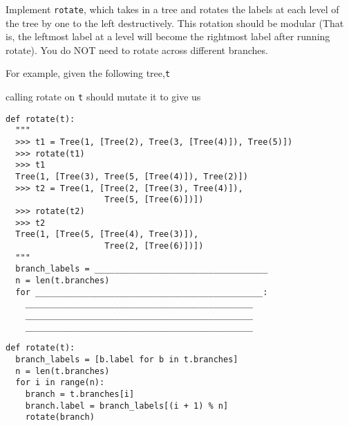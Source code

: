 \begin{blocksection}
\question Implement \texttt{rotate}, which takes in a tree and rotates the labels at each level of the tree by one to the left destructively. This rotation should be modular (That is, the leftmost label at a level will become the rightmost label after running rotate). You do NOT need to rotate across different branches.

For example, given the following tree,\texttt{t}


calling rotate on \texttt{t} should mutate it to give us 


\begin{lstlisting}
def rotate(t):
  """
  >>> t1 = Tree(1, [Tree(2), Tree(3, [Tree(4)]), Tree(5)])
  >>> rotate(t1)
  >>> t1
  Tree(1, [Tree(3), Tree(5, [Tree(4)]), Tree(2)])
  >>> t2 = Tree(1, [Tree(2, [Tree(3), Tree(4)]), 
                    Tree(5, [Tree(6)])])
  >>> rotate(t2)
  >>> t2
  Tree(1, [Tree(5, [Tree(4), Tree(3)]), 
                    Tree(2, [Tree(6)])])
  """
  branch_labels = ___________________________________
  n = len(t.branches)
  for ______________________________________________:
    ______________________________________________
    ______________________________________________
    ______________________________________________ 
\end{lstlisting}
\end{blocksection}

\begin{blocksection}
\begin{solution}
\begin{lstlisting}
def rotate(t):
  branch_labels = [b.label for b in t.branches]
  n = len(t.branches)
  for i in range(n):
    branch = t.branches[i]
    branch.label = branch_labels[(i + 1) % n]
    rotate(branch)
\end{lstlisting}
\end{solution}
\end{blocksection}